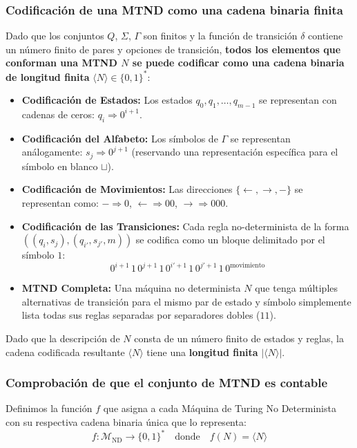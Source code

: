 \subsubsection*{Codificación de una MTND como una cadena binaria finita}
Dado que los conjuntos \(Q\), \(\Sigma\), \(\Gamma\) son finitos y la función de transición \(\delta\) contiene un número finito de pares y opciones de transición, \textbf{todos los elementos que conforman una MTND \(N\) se puede codificar como una cadena binaria de longitud finita} \(\langle N \rangle \in \{0, 1\}^*\):

\begin{itemize}
    \item \textbf{Codificación de Estados:} Los estados \(q_0, q_1, \dots, q_{m-1}\) se representan con cadenas de ceros: \(q_i \Longrightarrow 0^{i+1}\).
    \item \textbf{Codificación del Alfabeto:} Los símbolos de \(\Gamma\) se representan análogamente: \(s_j \Longrightarrow 0^{j+1}\) (reservando una representación específica para el símbolo en blanco \(\sqcup\)).
    \item \textbf{Codificación de Movimientos:} Las direcciones \(\{\leftarrow, \rightarrow, -\}\) se representan como: \(- \Longrightarrow 0\), \(\leftarrow \Longrightarrow 00\), \(\rightarrow \Longrightarrow 000\).
    \item \textbf{Codificación de las Transiciones:} Cada regla no-determinista de la forma \(((q_i, s_j), (q_{i'}, s_{j'}, m))\) se codifica como un bloque delimitado por el símbolo \(1\):
    \[
        0^{i+1} \, 1 \, 0^{j+1} \, 1 \, 0^{i'+1} \, 1 \, 0^{j'+1} \, 1 \, 0^{\text{movimiento}}
    \]
    \item \textbf{MTND Completa:} Una máquina no determinista \(N\) que tenga múltiples alternativas de transición para el mismo par de estado y símbolo simplemente lista todas sus reglas separadas por separadores dobles (\(11\)).
\end{itemize}

Dado que la descripción de \(N\) consta de un número finito de estados y reglas, la cadena codificada resultante \(\langle N \rangle\) tiene una \textbf{longitud finita} \(|\langle N \rangle|\).

\subsubsection*{Comprobación de que el conjunto de MTND es contable}
Definimos la función \(f\) que asigna a cada Máquina de Turing No Determinista con su respectiva cadena binaria única que lo representa:
\[
    f : \mathcal{M}_{\text{ND}} \to \{0, 1\}^* \quad \text{donde} \quad f(N) = \langle N \rangle
\]

